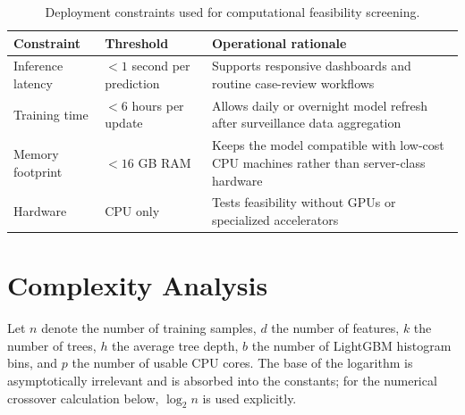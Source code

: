 \documentclass[11pt]{article}
\begin{document}
\begin{table}[ht]
\centering
\caption{Deployment constraints used for computational feasibility screening.}
\label{tab:deployment-constraints}
\begin{tabular}{>{\raggedright\arraybackslash}p{} >{\raggedright\arraybackslash}p{} >{\raggedright\arraybackslash}p{}}
\toprule
Constraint & Threshold & Operational rationale \\
\midrule
Inference latency & $<1$ second per prediction & Supports responsive dashboards and routine case-review workflows \\
Training time & $<6$ hours per update & Allows daily or overnight model refresh after surveillance data aggregation \\
Memory footprint & $<16$ GB RAM & Keeps the model compatible with low-cost CPU machines rather than server-class hardware \\
Hardware & CPU only & Tests feasibility without GPUs or specialized accelerators \\
\bottomrule
\end{tabular}
\end{table}

\section{Complexity Analysis}
Let $n$ denote the number of training samples, $d$ the number of features, $k$ the number of trees, $h$ the average tree depth, $b$ the number of LightGBM histogram bins, and $p$ the number of usable CPU cores. The base of the logarithm is asymptotically irrelevant and is absorbed into the constants; for the numerical crossover calculation below, $\log_2 n$ is used explicitly.
\end{document}
